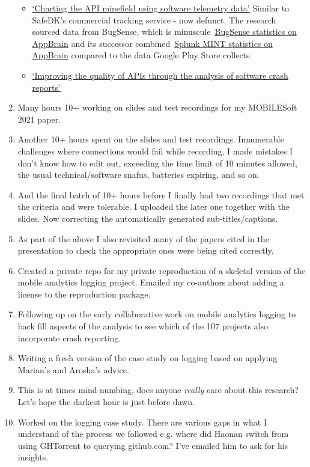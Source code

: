 \begin{enumerate}
\begin{itemize}
        \item \href{https://doi.org/10.1007/s10664-014-9343-7}{`Charting the API minefield using software telemetry data'} Similar to SafeDK's commercial tracking service - now defunct. The research sourced data from BugSense, which is minuscule~\href{https://www.appbrain.com/stats/libraries/details/bugsense/bugsense}{BugSense statistics on AppBrain} and its successor combined~\href{https://www.appbrain.com/stats/libraries/details/splunkmint/splunk-mint}{Splunk MINT statistics on AppBrain} compared to the data Google Play Store collects.
        \item \href{https://doi.org/10.4230/OASIcs.ICCSW.2013.57}{`Improving the quality of APIs through the analysis of software crash reports'}
    \end{itemize}
    \item Many hours 10+ working on slides and test recordings for my MOBILESoft 2021 paper.
    \item Another 10+ hours spent on the slides and test recordings. Innumerable challenges where connections would fail while recording, I made mistakes I don't know how to edit out, exceeding the time limit of 10 minutes allowed, the usual technical/software snafus, batteries expiring, and so on.
    \item And the final batch of 10+ hours before I finally had two recordings that met the criteria and were tolerable. I uploaded the later one together with the slides. Now correcting the automatically generated sub-titles/captions.
    \item As part of the above I also revisited many of the papers cited in the presentation to check the appropriate ones were being cited correctly.
    \item Created a private repo for my private reproduction of a skeletal version of the mobile analytics logging project. Emailed my co-authors about adding a license to the reproduction package.
    \item Following up on the early collaborative work on mobile analytics logging to back fill aspects of the analysis to see which of the 107 projects also incorporate crash reporting.
    \item Writing a fresh version of the case study on logging based on applying Marian's and Arosha's advice.
    \item This is at times mind-numbing, does anyone \textit{really} care about this research? Let's hope the darkest hour is just before dawn.
    \item Worked on the logging case study. There are various gaps in what I understand of the process we followed e.g. where did Haonan switch from using GHTorrent to querying github.com? I've emailed him to ask for his insights.

\end{enumerate}
